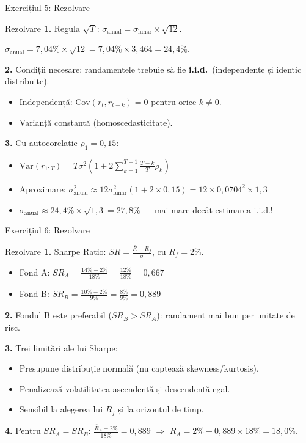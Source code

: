 \documentclass[9pt, aspectratio=169, t]{beamer}
\theoremstyle{definition}
\begin{document}
\begin{frame}{Exercițiul 5: Rezolvare}
\begin{block}{Rezolvare}
\textbf{1.} Regula $\sqrt{T}$: $\sigma_{\text{anual}} = \sigma_{\text{lunar}} \times \sqrt{12}$.

$\sigma_{\text{anual}} = 7{,}04\% \times \sqrt{12} = 7{,}04\% \times 3{,}464 = 24{,}4\%$.

\textbf{2.} Condiții necesare: randamentele trebuie să fie \textbf{i.i.d.}\ (independente și identic distribuite).
\begin{itemize}
\item Independență: $\text{Cov}(r_t, r_{t-k}) = 0$ pentru orice $k \neq 0$.
\item Varianță constantă (homoscedasticitate).
\end{itemize}

\textbf{3.} Cu autocorelație $\rho_1 = 0{,}15$:
\begin{itemize}
\item $\text{Var}(r_{1:T}) = T\sigma^2\left(1 + 2\sum_{k=1}^{T-1}\frac{T-k}{T}\rho_k\right)$
\item Aproximare: $\sigma_{\text{anual}}^2 \approx 12\sigma_{\text{lunar}}^2(1 + 2 \times 0{,}15) = 12 \times 0{,}0704^2 \times 1{,}3$
\item $\sigma_{\text{anual}} \approx 24{,}4\% \times \sqrt{1{,}3} = 27{,}8\%$ — mai mare decât estimarea i.i.d.!
\end{itemize}
\end{block}
\end{frame}

\begin{frame}{Exercițiul 6: Rezolvare}
\begin{block}{Rezolvare}
\textbf{1.} Sharpe Ratio: $SR = \frac{\bar{R} - R_f}{\sigma}$, cu $R_f = 2\%$.
\begin{itemize}
\item Fond A: $SR_A = \frac{14\% - 2\%}{18\%} = \frac{12\%}{18\%} = 0{,}667$
\item Fond B: $SR_B = \frac{10\% - 2\%}{9\%} = \frac{8\%}{9\%} = 0{,}889$
\end{itemize}

\textbf{2.} Fondul B este preferabil ($SR_B > SR_A$): randament mai bun per unitate de risc.

\textbf{3.} Trei limitări ale lui Sharpe:
\begin{itemize}
\item Presupune distribuție normală (nu captează skewness/kurtosis).
\item Penalizează volatilitatea ascendentă și descendentă egal.
\item Sensibil la alegerea lui $R_f$ și la orizontul de timp.
\end{itemize}

\textbf{4.} Pentru $SR_A = SR_B$: $\frac{\bar{R}_A - 2\%}{18\%} = 0{,}889$ $\Rightarrow$ $\bar{R}_A = 2\% + 0{,}889 \times 18\% = 18{,}0\%$.
\end{block}
\end{frame}
\end{document}
